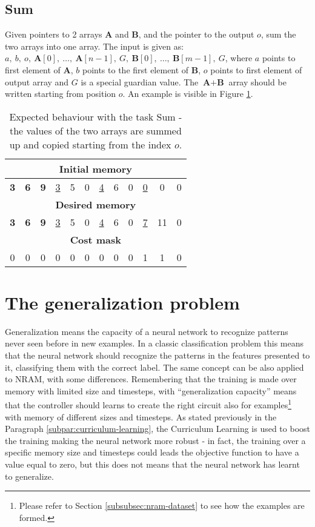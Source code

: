 \subsection{Sum}
Given pointers to 2 arrays \textbf{A} and \textbf{B}, and the pointer to the output $o$, sum the two arrays into one array. The input is given as: $a,\ b,\ o,\ \textbf{A}[0],\ \dots,\ \textbf{A}[n-1],\ G,\ \textbf{B}[0],\ \dots,\ \textbf{B}[m-1],\ G$, where $a$ points to first element of \textbf{A}, $b$ points to the first element of \textbf{B}, $o$ points to first element of output array and $G$ is a special guardian value. The $\textbf{A}+\textbf{B}$ array should be written starting from position $o$. An example is visible in Figure \ref{fig:sum-example}.
\begin{table}[h!]
	\centering
	\begin{tabular}{|c|c|c|c|c|c|c|c|c|c|c|c|}
		\hline
		\multicolumn{12}{|c|}{\textbf{Initial memory}} \\ \hline
		\textbf{3} & \textbf{6} & \textbf{9} & \underline{3} & 5 & 0 & \underline{4} & 6 & 0 & \underline{0} & 0 & 0 \\ \hline\hline\hline
		\multicolumn{12}{|c|}{\textbf{Desired memory}} \\ \hline
		\textbf{3} & \textbf{6} & \textbf{9} & \underline{3} & 5 & 0 & \underline{4} & 6 & 0 & \underline{7} & 11 & 0 \\ \hline\hline\hline
		\multicolumn{12}{|c|}{\textbf{Cost mask}} \\ \hline
		0 & 0 & 0 & 0 & 0 & 0 & 0 & 0 & 0 & 1 & 1 & 0 \\ \hline
	\end{tabular}
	\caption{Expected behaviour with the task Sum - the values of the two arrays are summed up and copied starting from the index $o$.}
	\label{fig:sum-example}
\end{table}
\FloatBarrier

\section{The generalization problem}
Generalization means the capacity of a neural network to recognize patterns never seen before in new examples. In a classic classification problem this means that the neural network should recognize the patterns in the features presented to it, classifying them with the correct label. The same concept can be also applied to NRAM, with some differences. Remembering that the training is made over memory with limited size and timesteps, with ``generalization capacity'' means that the controller should learns to create the right circuit also for examples\footnote{Please refer to Section \ref{subsubsec:nram-dataset} to see how the examples are formed.} with memory of different sizes and timesteps. As stated previously in the Paragraph \ref{subpar:curriculum-learning}, the Curriculum Learning is used to boost the training making the neural network more robust - in fact, the training over a specific memory size and timesteps could leads the objective function to have a value equal to zero, but this does not means that the neural network has learnt to generalize.

